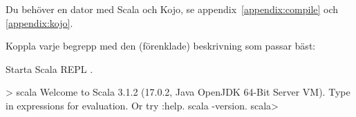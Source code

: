 
\ifPreSolution
\Exercise{\ExeWeekONE}\label{exe:W01}

\begin{Goals}

\end{Goals}

\begin{Preparations}
\item {}
\item Du behöver en dator med Scala och Kojo, se appendix~\ref{appendix:compile} och  \ref{appendix:kojo}.
\end{Preparations}

\else

\ExerciseSolution{\ExeWeekONE}

\fi  %


\BasicTasks





\QUESTBEGIN

\Task \what

\vspace{1em}\noindent Koppla varje begrepp med den (förenklade) beskrivning som passar bäst:

\begin{ConceptConnections}

\end{ConceptConnections}

\SOLUTION

\TaskSolved \what

\begin{ConceptConnections}

\end{ConceptConnections}

\QUESTEND







\QUESTBEGIN

\Task \what

\vspace{1em}\noindent Starta Scala REPL .

\begin{REPLnonum}
> scala
Welcome to Scala 3.1.2 (17.0.2, Java OpenJDK 64-Bit Server VM).
Type in expressions for evaluation. Or try :help.
scala -version.
scala>
\end{REPLnonum}

